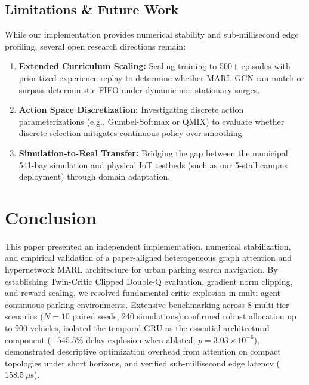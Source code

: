 \documentclass[journal]{IEEEtran}
\begin{document}
\subsection{Limitations \& Future Work}
While our implementation provides numerical stability and sub-millisecond edge profiling, several open research directions remain:
\begin{enumerate}
    \item \textbf{Extended Curriculum Scaling:} Scaling training to 500+ episodes with prioritized experience replay to determine whether MARL-GCN can match or surpass deterministic FIFO under dynamic non-stationary surges.
    \item \textbf{Action Space Discretization:} Investigating discrete action parameterizations (e.g., Gumbel-Softmax or QMIX) to evaluate whether discrete selection mitigates continuous policy over-smoothing.
    \item \textbf{Simulation-to-Real Transfer:} Bridging the gap between the municipal 541-bay simulation and physical IoT testbeds (such as our 5-stall campus deployment) through domain adaptation.
\end{enumerate}

\section{Conclusion}
This paper presented an independent implementation, numerical stabilization, and empirical validation of a paper-aligned heterogeneous graph attention and hypernetwork MARL architecture for urban parking search navigation. By establishing Twin-Critic Clipped Double-Q evaluation, gradient norm clipping, and reward scaling, we resolved fundamental critic explosion in multi-agent continuous parking environments. Extensive benchmarking across 8 multi-tier scenarios ($N=10$ paired seeds, 240 simulations) confirmed robust allocation up to 900 vehicles, isolated the temporal GRU as the essential architectural component ($+545.5\%$ delay explosion when ablated, $p = 3.03 \times 10^{-6}$), demonstrated descriptive optimization overhead from attention on compact topologies under short horizons, and verified sub-millisecond edge latency ($158.5~\mu$s).



\end{document}
